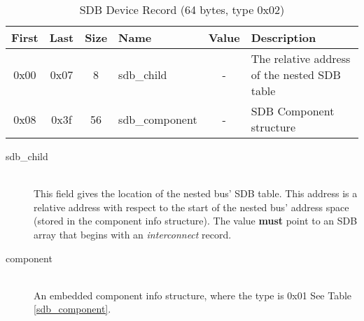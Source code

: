 \documentclass[a4paper, 12pt]{article}
\begin{document}
\begin{center}
  \begin{savenotes}
    \begin{table}[!ht]\footnotesize
      \caption{SDB Device Record (64 bytes, type 0x02)}\label{sdb_bridge}\centering
        \begin{tabular}{| c | c | c | l | c | p{5cm} |} \hline
        First & Last & Size & Name & Value & Description \\ \hline
        0x00 & 0x07 & 8 & sdb\_child & - & The relative address of the nested SDB table \\ \hline
        0x08 & 0x3f & 56 & sdb\_component & - & SDB Component structure \\ \hline
        \end{tabular}
    \end{table}
  \end{savenotes}
\end{center}

\begin{description}
\item[sdb\_child] \hfill \\
This field gives the location of the nested bus' SDB table. This address is a relative address
with respect to the start of the nested bus' address space (stored in the component info structure).
The value \textbf{must} point to an SDB array that begins with an \textit{interconnect} record.

\item[component] \hfill \\
An embedded component info structure, where the type is 0x01 See Table \ref{sdb_component}.
\end{description}
\end{document}
